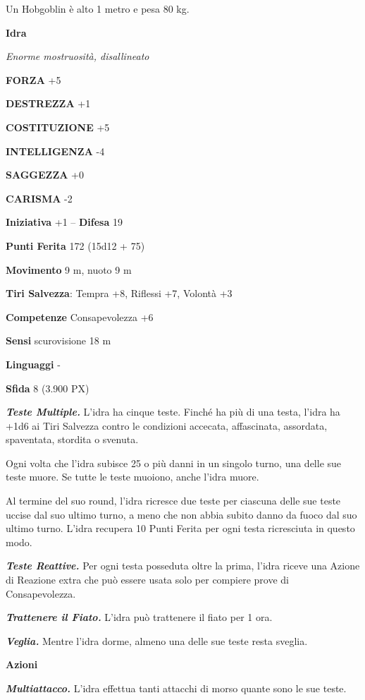 \begin{multicols}{2}
Un Hobgoblin è alto 1 metro e pesa 80 kg.


\medskip{}\textbf{Idra}

\textit{Enorme mostruosità, disallineato}

\textbf{FORZA} +5

\textbf{DESTREZZA} +1

\textbf{COSTITUZIONE} +5

\textbf{INTELLIGENZA} -4

\textbf{SAGGEZZA} +0

\textbf{CARISMA} -2

\textbf{Iniziativa} +1 -- \textbf{Difesa} 19

\textbf{Punti Ferita} 172 (15d12 + 75)

\textbf{Movimento} 9 m, nuoto 9 m

\textbf{Tiri Salvezza}: Tempra +8, Riflessi +7, Volontà +3

\textbf{Competenze} Consapevolezza +6

\textbf{Sensi} scurovisione 18 m

\textbf{Linguaggi} -

\textbf{Sfida} 8 (3.900 PX)

\textit{\textbf{Teste Multiple.}} L'idra ha cinque teste. Finché ha più di una testa, l'idra ha +1d6 ai Tiri Salvezza contro le condizioni accecata, affascinata, assordata, spaventata, stordita o svenuta.

Ogni volta che l'idra subisce 25 o più danni in un singolo turno, una delle sue teste muore. Se tutte le teste muoiono, anche l'idra muore.

Al termine del suo round, l'idra ricresce due teste per ciascuna delle sue teste uccise dal suo ultimo turno, a meno che non abbia subito danno da fuoco dal suo ultimo turno. L'idra recupera 10 Punti Ferita per ogni testa ricresciuta in questo modo.

\textit{\textbf{Teste Reattive.}} Per ogni testa posseduta oltre la prima, l'idra riceve una Azione di Reazione extra che può essere usata solo per compiere prove di Consapevolezza.

\textit{\textbf{Trattenere il Fiato.}} L'idra può trattenere il fiato per 1 ora.

\textit{\textbf{Veglia.}} Mentre l'idra dorme, almeno una delle sue teste resta sveglia.

\textbf{Azioni}

\textit{\textbf{Multiattacco.}} L'idra effettua tanti attacchi di morso quante sono le sue teste.


\end{multicols}
